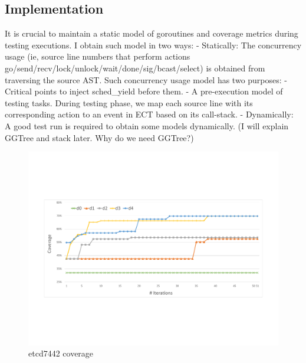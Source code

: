 \subsection{Implementation}
It is crucial to maintain a static model of goroutines and coverage metrics during testing executions. I obtain such model in two ways:
-	Statically: The concurrency usage (ie, source line numbers that perform actions go/send/recv/lock/unlock/wait/done/sig/bcast/select) is obtained from traversing the source AST. Such concurrency usage model has two purposes:
- Critical points to inject sched\_yield before them.
- A pre-execution model of testing tasks. During testing phase, we map each source line with its corresponding action to an event in ECT based on its call-stack.
-	Dynamically: A good test run is required to obtain some models dynamically. (I will explain GGTree and stack later. Why do we need GGTree?)




\begin{figure}
\centering
  \includegraphics[width=.95\linewidth]{figs/coverage_etcd7443.pdf}
  \caption{etcd7442 coverage}
  \label{fig:etcd_coverage}
\end{figure}


